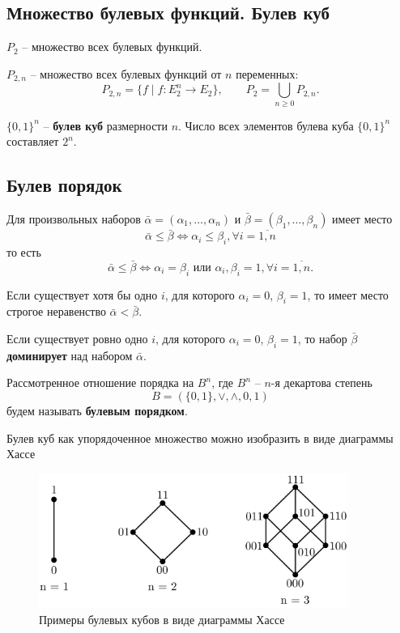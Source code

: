 \documentclass[a5paper, 11pt]{extarticle}
\theoremstyle{definition}
\theoremstyle{definition}
\theoremstyle{definition}
\numberwithin{figure}{section}
\numberwithin{table}{section}
\begin{document}
\subsection{Множество булевых функций. Булев куб}

\(P_2\) -- множество всех булевых функций.

\(P_{2, n}\) -- множество всех булевых функций от \(n\) переменных:
\[
    P_{2, n} = \{f \mid f : E_2^n \to E_2\},
    \qquad
    P_2 = \bigcup_{n \geq 0} P_{2, n}.
\]

\(\{0, 1\}^n\) -- \textbf{булев куб} размерности \(n\). Число всех элементов булева куба \(\{0, 1\}^n\) составляет \(2^n\).

\subsection{Булев порядок}

Для произвольных наборов \(\bar{\alpha} = (\alpha_1, \ldots, \alpha_n)\) и \(\bar{\beta} = (\beta_1, \ldots, \beta_n)\) имеет место
\[
    \bar{\alpha} \leq \bar{\beta}
    \iff
    \alpha_i \leq \beta_i,
    \forall i = \overline{1, n}
\]
то есть
\[
    \bar{\alpha} \leq \bar{\beta}
    \iff
    \alpha_i = \beta_i
    \text{ или }
    \alpha_i, \beta_i = 1, \forall i = \overline{1, n}.
\]

Если существует хотя бы одно \(i\), для которого \(\alpha_i = 0\), \(\beta_i = 1\), то имеет место строгое неравенство \(\bar{\alpha} < \bar{\beta}\).

Если существует ровно одно \(i\), для которого \(\alpha_i = 0\), \(\beta_i = 1\), то набор \(\bar{\beta}\) \textbf{доминирует} над набором \(\bar{\alpha}\).

Рассмотренное отношение порядка на \(B^n\), где \(B^n\) -- \(n\)-я декартова степень
\[
    B = (\{0, 1\}, \lor, \land, 0, 1)
\]
будем называть \textbf{булевым порядком}.

Булев куб как упорядоченное множество можно изобразить в виде диаграммы Хассе
\begin{figure}[H]
    \centering
    \includegraphics[width=0.9\textwidth]{images/boolean-cube.png}
    \caption{Примеры булевых кубов в виде диаграммы Хассе}
\end{figure}
\end{document}

